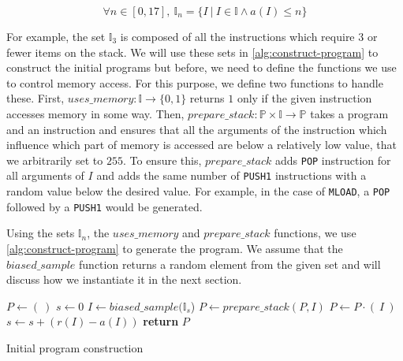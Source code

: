   \begin{equation}
    \label{eq:instr-args}
    \forall n \in [0, 17],~ \mathbb{I}_n = \{I~|~I\in \mathbb{I} \land a(I) \leq n\}
  \end{equation}

  For example, the set $\mathbb{I}_3$ is composed of all the instructions which require $3$ or fewer items on the stack.
  We will use these sets in \autoref{alg:construct-program} to construct the initial programs but before, we need to define the functions we use to control memory access. For this purpose, we define two functions to handle these. First, $uses\_memory : \mathbb{I} \rightarrow \{0, 1\}$ returns $1$ only if the given instruction accesses memory in some way. Then, $prepare\_stack: \mathbb{P}\times\mathbb{I}\rightarrow \mathbb{P}$ takes a program and an instruction and ensures that all the arguments of the instruction which influence which part of memory is accessed are below a relatively low value, that we arbitrarily set to $255$. To ensure this, $prepare\_stack$ adds \lstinline{POP} instruction for all arguments of $I$ and adds the same number of \lstinline{PUSH1} instructions with a random value below the desired value. For example, in the case of \lstinline{MLOAD}, a \lstinline{POP} followed by a \lstinline{PUSH1} would be generated.

  Using the sets $\mathbb{I}_n$, the $uses\_memory$ and $prepare\_stack$ functions, we use \autoref{alg:construct-program} to generate the program. We assume that the $biased\_sample$ function returns a random element from the given set and will discuss how we instantiate it in the next section.

  \begin{algorithm}
    \begin{algorithmic}
      \State $P \gets (~)$
      \State $s\gets 0$
      \State $I \gets biased\_sample(\mathbb{I}_s$)
        \State $P \gets prepare\_stack(P, I)$
        \EndIf
        \State $P \gets P \cdot (~I~)$
        \State $s \gets s + (r(I) - a(I))$
        \EndFor
        \State \textbf{return} $P$
      \EndFunction
    \end{algorithmic}
    \caption{Initial program construction}
    \label{alg:construct-program}
  \end{algorithm}


